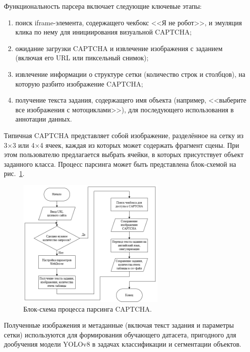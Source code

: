 Функциональность парсера включает следующие ключевые этапы:

\begin{enumerate}
    \item поиск iframe-элемента, содержащего чекбокс <<Я не робот>>, и эмуляция клика по нему для инициирования визуальной CAPTCHA;
    \item ожидание загрузки CAPTCHA и извлечение изображения с заданием (включая его URL или пиксельный снимок);
    \item извлечение информации о структуре сетки (количество строк и столбцов), на которую разбито изображение CAPTCHA;
    \item получение текста задания, содержащего имя объекта (например, <<выберите все изображения с мотоциклами>>), для последующего использования в аннотации данных.
\end{enumerate}

Типичная CAPTCHA представляет собой изображение, разделённое на сетку из 3×3 или 4×4 ячеек, каждая из которых может содержать фрагмент сцены. При этом пользователю предлагается выбрать ячейки, в которых присутствует объект заданного класса. Процесс парсинга может быть представлена блок-схемой на рис.~\ref{fig:captcha-flow}.

\begin{figure}[H]
    \centering
    \includegraphics[width=0.65\textwidth]{imgs/image_captcha_flow.png}
    \caption{Блок-схема процесса парсинга CAPTCHA.}
    \label{fig:captcha-flow}
\end{figure}
\vspace{-0.5cm}

Полученные изображения и метаданные (включая текст задания и параметры сетки) используются для формирования обучающего датасета, пригодного для дообучения модели YOLOv8 в задачах классификации и сегментации объектов.

